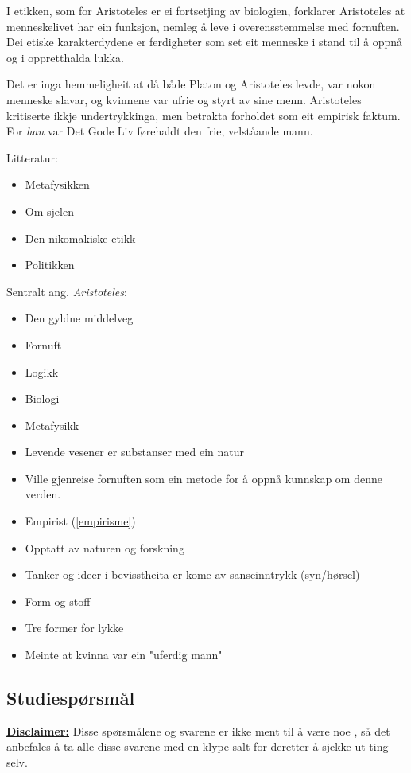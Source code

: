 \documentclass[a4paper]{IEEEtran}
\begin{document}
I etikken, som for Aristoteles er ei fortsetjing av biologien, forklarer Aristoteles at menneskelivet har ein funksjon, nemleg å leve i overensstemmelse med fornuften. Dei etiske karakterdydene er ferdigheter som set eit menneske i stand til å oppnå og i oppretthalda lukka.\bigskip

Det er inga hemmeligheit at då både Platon og Aristoteles levde, var nokon menneske slavar, og kvinnene var ufrie og styrt av sine menn. Aristoteles kritiserte ikkje undertrykkinga, men betrakta forholdet som eit empirisk faktum. For \textit{han} var Det Gode Liv førehaldt den frie, velståande mann. 

\begin{center}
Litteratur:
\end{center}
\begin{itemize}
    \item Metafysikken
    \item Om sjelen
    \item Den nikomakiske etikk
    \item Politikken
\end{itemize}\bigskip

\begin{center}
Sentralt ang. \textit{Aristoteles}:
\end{center}
\begin{itemize}\bigskip
    \item Den gyldne middelveg
    \item Fornuft
    \item Logikk
    \item Biologi
    \item Metafysikk
    \item Levende vesener er substanser med ein natur
    \item Ville gjenreise fornuften som ein metode for å oppnå kunnskap om denne verden.
    \item Empirist (\ref{empirisme})
    \item Opptatt av naturen og forskning
    \item Tanker og ideer i bevisstheita er kome av sanseinntrykk (syn/hørsel)
    \item Form og stoff 
    \item Tre former for lykke
    \item Meinte at kvinna var ein "uferdig mann"
    
\end{itemize}\bigskip

 \subsection{Studiespørsmål}
     \underline{\textbf{Disclaimer:}} Disse spørsmålene og svarene er ikke ment til
     å være noe , så det anbefales å ta 
     alle disse svarene med en klype salt for deretter å sjekke ut ting selv.
\end{document}
